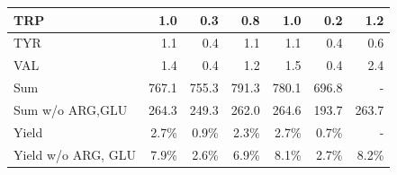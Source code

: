 \documentclass[12pt]{article}
\begin{document}
\begin{table}
\begin{tabular}{lrrrrrr}
        TRP & 1.0 & 0.3 & 0.8 & 1.0 & 0.2 & 1.2 \\ \hline
        TYR & 1.1 & 0.4 & 1.1 & 1.1 & 0.4 & 0.6 \\ \hline
        VAL & 1.4 & 0.4 & 1.2 & 1.5 & 0.4 & 2.4 \\ \midrule
        Sum & 767.1 & 755.3 & 791.3 & 780.1 & 696.8 & - \\ \hline
        Sum w/o ARG,GLU & 264.3 & 249.3 & 262.0 & 264.6 & 193.7 & 263.7 \\ \midrule
        Yield & 2.7\% & 0.9\% & 2.3\% & 2.7\% & 0.7\% & - \\ \hline
        Yield w/o ARG, GLU & 7.9\% & 2.6\% & 6.9\% & 8.1\% & 2.7\% & 8.2\% \\ \bottomrule
    \end{tabular}
\label{tbl:yield_breakdown}
\end{table}
\end{document}
